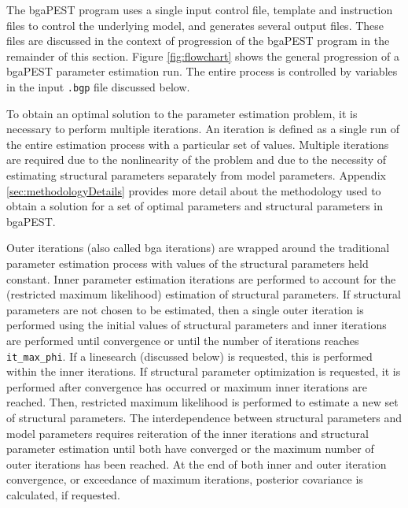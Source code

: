 \documentclass[11pt,oneside,onecolumn]{usgsreport}
\begin{document}
\begin{multicols}{2}

The bgaPEST program uses a single input control file, template and
instruction files to control the underlying model, and generates several
output files. These files are discussed in the context of progression
of the bgaPEST program in the remainder of this section. Figure \ref{fig:flowchart}
shows the general progression of a bgaPEST parameter estimation run.
The entire process is controlled by variables in the input \texttt{.bgp}
file discussed below. 

To obtain an optimal solution to the parameter estimation problem,
it is necessary to perform multiple iterations. An iteration is defined
as a single run of the entire estimation process with a particular
set of values. Multiple iterations are required due to the nonlinearity
of the problem and due to the necessity of estimating structural parameters
separately from model parameters. Appendix \ref{sec:methodologyDetails}
provides more detail about the methodology used to obtain a solution
for a set of optimal parameters and structural parameters in bgaPEST. 

Outer iterations (also called bga iterations) are wrapped around the
traditional parameter estimation process with values of the structural
parameters held constant. Inner parameter estimation iterations are
performed to account for the (restricted maximum likelihood) estimation
of structural parameters. If structural parameters are not chosen
to be estimated, then a single outer iteration is performed using
the initial values of structural parameters and inner iterations are
performed until convergence or until the number of iterations reaches
\texttt{it\_max\_phi}. If a linesearch (discussed below) is requested,
this is performed within the inner iterations. If structural parameter
optimization is requested, it is performed after convergence has occurred
or maximum inner iterations are reached. Then, restricted maximum
likelihood is performed to estimate a new set of structural parameters.
The interdependence between structural parameters and model parameters
requires reiteration of the inner iterations and structural parameter
estimation until both have converged or the maximum number of outer
iterations has been reached. At the end of both inner and outer iteration
convergence, or exceedance of maximum iterations, posterior covariance
is calculated, if requested.


\end{multicols}
\end{document}
